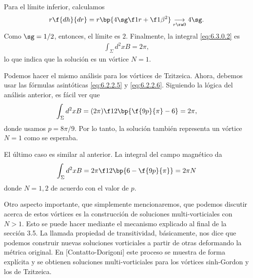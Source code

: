 Para el límite inferior, calculamos
\begin{align}
	r\f{dh}{dr} = r\bp{4\sg\f 1r+\f 1{\beta^2}}\underset{r\ra 0}{\longrightarrow} 4\sg.
\end{align}
Como $\sg = 1/2$, entonces, el límite es $2$. Finalmente, la integral \eqref{eq:6.3.0.2} es
\begin{align}
	\int_{\Sigma}d^2x B = 2\pi,
\end{align}
lo que indica que la solución es un vórtice $N=1$.

Podemos hacer el mismo análisis para los vórtices de Tzitzeica. Ahora, debemos usar las fórmulas asintóticas \eqref{eq:6.2.2.5} y \eqref{eq:6.2.2.6}. Siguiendo la lógica del análisis anterior, es fácil ver que
\begin{align}
	\int_{\Sigma} d^2x B = (2\pi)\f 12\bp{\f{9p}{\pi}-6} = 2\pi,
\end{align}
donde usamos $p=8\pi/9$. Por lo tanto, la solución también representa un vórtice $N=1$ como se esperaba.

El último caso es similar al anterior. La integral del campo magnético da
\begin{align}
	\int_{\Sigma} d^2x B = 2\pi\f 12\bp{6-\f{9p}{\pi}} = 2\pi N
\end{align}
donde $N=1,2$ de acuerdo con el valor de $p$.

Otro aspecto importante, que simplemente mencionaremos, que podemos discutir acerca de estos vórtices es la construcción de soluciones multi-vorticiales con $N>1$. Esto se puede hacer mediante el mecanismo explicado al final de la sección 3.5. La llamada propiedad de transitividad, básicamente, nos dice que podemos construir nuevas soluciones vorticiales a partir de otras deformando la métrica original. En [Contatto-Dorigoni] este proceso se muestra de forma explícita y se obtienen soluciones multi-vorticiales para los vórtices sinh-Gordon y los de Tzitzeica.